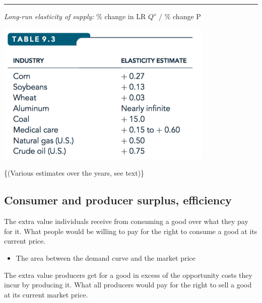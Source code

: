 \documentclass[]{article}
\providecommand{\tightlist}{%
  \setlength{\itemsep}{0pt}\setlength{\parskip}{0pt}}
\begin{document}
\begin{center}\rule{0.5\linewidth}{\linethickness}\end{center}

\emph{Long-run elasticity of supply:} \% change in LR \(Q^s\) / \% change P

\includegraphics[height=2.7in]{picsfigs/lr_supplyelast_ests.png}

\footnotesize\{(Various estimates over the years, see text)\}

\hypertarget{consumer-and-producer-surplus-efficiency}{%
\subsection{Consumer and producer surplus, efficiency}\label{consumer-and-producer-surplus-efficiency}}

\begin{description}
\tightlist
\item[Consumer surplus (reprise)]
The extra value individuals receive from consuming a good over what they pay for it. What people would be willing to pay for the right to consume a good at its current price.
\end{description}

\begin{itemize}
\tightlist
\item
  The area between the demand curve and the market price
\end{itemize}

\bigskip

\begin{description}
\tightlist
\item[Producer surplus (reprise)]
The extra value producers get for a good in excess of the opportunity costs they incur by producing it. What all producers would pay for the right to sell a good at its current market price.
\end{description}
\end{document}
